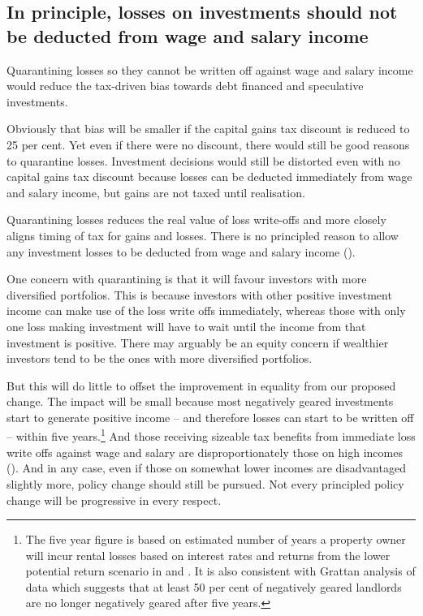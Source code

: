 \subsection{In principle, losses on investments should not be deducted from wage and salary income}\label{subsec:In-principle-losses-should-not-be-deducted-from-salary}
Quarantining losses so they cannot be written off against wage and salary income would reduce the tax-driven bias towards debt financed and speculative investments. 

Obviously that bias will be smaller if the capital gains tax discount is reduced to 25 per cent. 
Yet even if there were no discount, there would still be good reasons to quarantine losses. Investment decisions would still be distorted even with no capital gains tax discount because losses can be deducted immediately from wage and salary income, but gains are not taxed until realisation.

Quarantining losses reduces the real value of loss write-offs and more closely aligns timing of tax for gains and losses. There is no principled reason to allow any investment losses to be deducted from wage and salary income (). 

One concern with quarantining is that it will favour investors with more diversified portfolios. This is because investors with other positive investment income can make use of the loss write offs immediately, whereas those with only one loss making investment will have to wait until the income from that investment is positive. There may arguably be an equity concern if wealthier investors tend to be the ones with more diversified portfolios. 

But this will do little to offset the improvement in equality from our proposed change. 
The impact will be small because most negatively geared investments start to generate positive income – and therefore losses can start to be written off – within five years.\footnote{The five year figure\label{footnote:number-years-for-NG} is based on estimated number of years a property owner will incur rental losses based on interest rates and returns from the lower potential return scenario in  and . It is also consistent with Grattan analysis of \textcite{HILDA2015} data which suggests that at least 50 per cent of negatively geared landlords are no longer negatively geared after five years. }  
And those receiving sizeable tax benefits from immediate loss write offs against wage and salary are disproportionately those on high incomes (). 
And in any case, even if those on somewhat lower incomes are disadvantaged slightly more, policy change should still be pursued. Not every principled policy change will be progressive in every respect.


